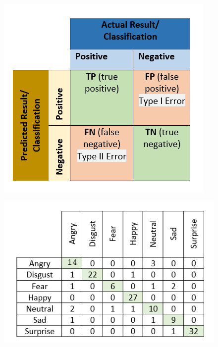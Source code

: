 \begin{itemize}
\begin{figure}[H]
\centering
\begin{minipage}{.485\textwidth}
  \centering
  \includegraphics[width=.9\linewidth]{conf}
  \label{fig:conf}
\end{minipage}%
\begin{minipage}{.485\textwidth}
  \centering
  \includegraphics[width=.9\linewidth]{conf1}
  \label{fig:conf1}
\end{minipage}
\end{figure}
 
\end{itemize}

